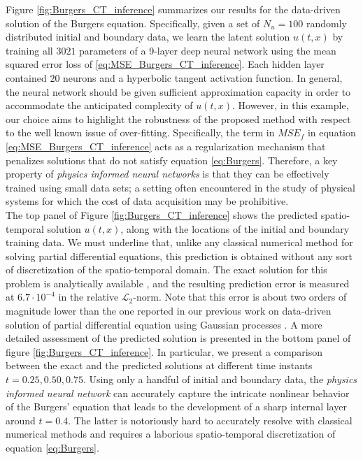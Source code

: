 \documentclass[preprint,12pt]{elsarticle}
\begin{document}
Figure \ref{fig:Burgers_CT_inference} summarizes our results for the data-driven solution of the Burgers equation. Specifically, given a set of $N_u = 100$ randomly distributed initial and boundary data, we learn the latent solution $u(t,x)$ by training all $3021$ parameters of a 9-layer deep neural network using the mean squared error loss of \eqref{eq:MSE_Burgers_CT_inference}. Each hidden layer contained $20$ neurons and a hyperbolic tangent activation function. In general, the neural network should be given sufficient approximation capacity in order to accommodate the anticipated complexity of $u(t,x)$. However, in this example, our choice aims to highlight the robustness of the proposed method with respect to the well known issue of over-fitting. Specifically, the term in $MSE_f$ in equation \eqref{eq:MSE_Burgers_CT_inference} acts as a regularization mechanism that penalizes solutions that do not satisfy equation \eqref{eq:Burgers}. Therefore, a key property of {\em physics informed neural networks} is that they can be effectively trained using small data sets; a setting often encountered in the study of physical systems for which the cost of data acquisition may be prohibitive.\\

The top panel of Figure \ref{fig:Burgers_CT_inference} shows the predicted spatio-temporal solution $u(t,x)$, along with the locations of the initial and boundary training data. We must underline that, unlike any classical numerical method for solving partial differential equations, this prediction is obtained without any sort of discretization of the spatio-temporal domain. The exact solution for this problem is analytically available \cite{basdevant1986spectral}, and the resulting prediction error is measured at $6.7 \cdot 10^{-4}$ in the relative $\mathcal{L}_2$-norm. Note that this error is about two orders of magnitude lower than the one reported in our previous work on data-driven solution of partial differential equation using Gaussian processes \cite{raissi2017numerical}. A more detailed assessment of the predicted solution is presented in the bottom panel of figure \ref{fig:Burgers_CT_inference}. In particular, we present a comparison between the exact and the predicted solutions at different time instants $t=0.25,0.50,0.75$. Using only a handful of initial and boundary data, the {\em physics informed neural network} can accurately capture the intricate nonlinear behavior of the Burgers' equation that leads to the development of a sharp internal layer around $t = 0.4$. The latter is notoriously hard to accurately resolve with classical numerical methods and requires a laborious spatio-temporal discretization of equation \eqref{eq:Burgers}.\\
\end{document}
